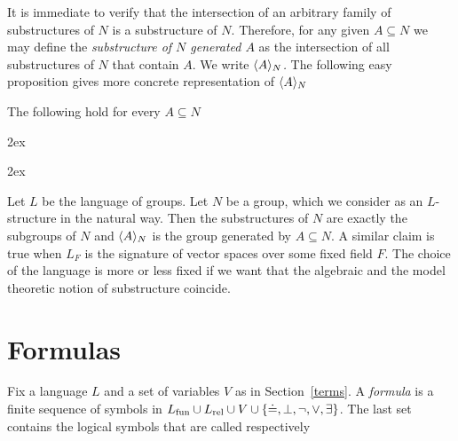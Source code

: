 It is immediate to verify that the intersection of an arbitrary family of substructures of $N$ is a substructure of $N$. Therefore, for any given $A\subseteq N$ we may define the \emph{substructure of $N$ generated $A$\/} as the intersection of all substructures of $N$ that contain $A$. We write \emph{$\langle A\rangle_N$.} The following easy proposition gives more concrete representation of $\langle A\rangle_N$
%
\begin{lemma}\label{strutturagenerata}
The following hold for every $A\subseteq N$



\kern2ex

\kern2ex

\end{lemma}

\begin{example}\label{ex_substructure}
Let $L$ be the language of groups. Let $N$ be a group, which we consider as an $L$-structure in the natural way. Then the substructures of $N$ are exactly the subgroups of $N$ and $\langle A\rangle_N$ is the group generated by $A\subseteq N$. A similar claim is true when $L_F$ is the signature of vector spaces over some fixed field $F$. The choice of the language is more or less fixed if we want that the algebraic and the model theoretic notion of substructure coincide.
\end{example}

\section{Formulas}\label{sintassformule}

Fix a language $L$ and a set of variables $V$ as in Section~\ref{terms}.
A \emph{formula\/} is a finite sequence of symbols in $L_{\rm fun}\cup L_{\rm rel}\cup V\cup \{\doteq,\bot,\neg,\vee,\exists\}$. The last set contains the logical symbols that are called respectively



\def\ceq#1#2{\parbox{3ex}{\noindent\emph{#1}\ }\parbox{27ex}{\ \emph{#2}\ }}



